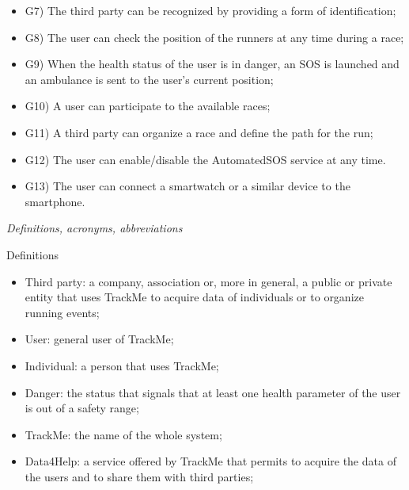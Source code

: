 \documentclass{article}
\begin{document}
\begin{legal}
\begin{legal}
\begin{legal}
{\begin{itemize}
				\item G7) The third party can be recognized by providing a form of identification;\\
				\item G8) The user can check the position of the runners at any time during a race;\\
				\item G9) When the health status of the user is in danger, an SOS is launched and an ambulance is sent to the user’s current position;\\
				\item G10) A user can participate to the available races;\\
				\item G11) A third party can organize a race and define the path for the run;\\
				\item G12) The user can enable/disable the AutomatedSOS service at any time.\\
				\item G13) The user can connect a smartwatch or a similar device to the smartphone.\\
				\end{itemize}
			}
			\end{legal}
		\item \textit{Definitions, acronyms, abbreviations}\\
			\begin{legal}
			\item Definitions\\
			{\normalfont
				\begin{itemize}
				\item Third party: a company, association or, more in general, a public or private entity that uses TrackMe to acquire data of individuals or to organize running events;\\
				\item User:  general user of TrackMe;\\
				\item Individual: a person that uses TrackMe;\\
				\item Danger: the status that signals that at least one health parameter of the user is out of a safety range;\\
				\item TrackMe: the name of the whole system;\\
				\item Data4Help: a service offered by TrackMe that permits to acquire the data of the users and to share them with third parties;\\

\end{itemize}}
\end{legal}
\end{legal}
\end{legal}
\end{document}
